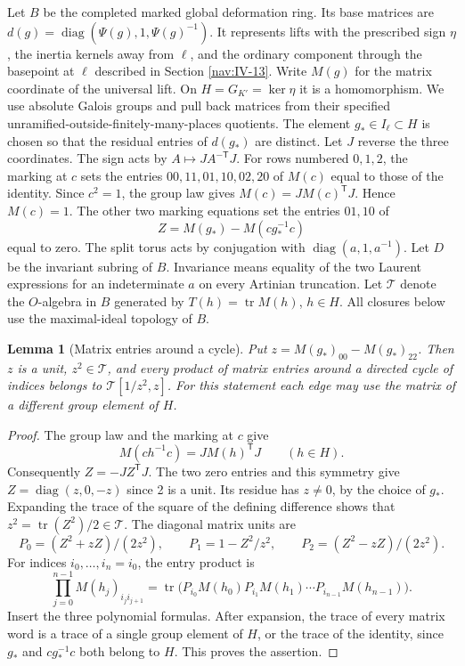 \documentclass[a4paper,11pt]{article}
\newtheorem{lemma}[proposition]{Lemma}
\theoremstyle{definition}
\theoremstyle{remark}
\numberwithin{equation}{section}
\begin{document}
Let \(B\) be the completed marked global deformation ring.
Its base matrices are
\(d(g)=\operatorname{diag}(\Psi(g),1,\Psi(g)^{-1})\).
It represents lifts with the prescribed sign \(\eta\), the
inertia kernels away from \(\ell\), and the ordinary component
through the basepoint at \(\ell\) described in Section \ref{nav:IV-13}. Write \(M(g)\) for the matrix coordinate of the
universal lift. On \(H=G_{K'}=\ker\eta\) it is a homomorphism.
We use absolute Galois groups and pull back matrices from their
specified unramified-outside-finitely-many-places quotients.
The element \(g_*\in I_\ell\subset H\) is chosen so that the
residual entries of \(d(g_*)\) are distinct. Let \(J\) reverse
the three coordinates. The sign acts by
\(A\mapsto J A^{-\mathsf T}J\).
For rows numbered \(0,1,2\), the marking at \(c\) sets the
entries \(00,11,01,10,02,20\) of \(M(c)\) equal to those of
the identity. Since \(c^2=1\), the group law gives
\(M(c)=J M(c)^{\mathsf T}J\). Hence \(M(c)=1\).
The other two marking equations set the entries \(01,10\) of
\[
                  Z=M(g_*)-M(cg_*^{-1}c)
\]
equal to zero. The split torus acts by conjugation with
\(\operatorname{diag}(a,1,a^{-1})\). Let \(D\) be the
invariant subring of \(B\). Invariance means equality of the two
Laurent expressions for an indeterminate \(a\) on every Artinian
truncation. Let \(\mathcal T\) denote the \(O\)-algebra in \(B\)
generated by \(T(h)=\operatorname{tr}M(h)\), \(h\in H\).
All closures below use the maximal-ideal topology of \(B\).

\begin{lemma}[Matrix entries around a cycle]\label{lem:cycle71}
Put \(z=M(g_*)_{00}-M(g_*)_{22}\).
Then \(z\) is a unit, \(z^2\in\mathcal T\), and every product of
matrix entries around a directed cycle of indices belongs to
\(\mathcal T[1/z^2,z]\). For this statement each edge may use
the matrix of a different group element of \(H\).
\end{lemma}
\begin{proof}
The group law and the marking at \(c\) give
\[
               M(ch^{-1}c)=J M(h)^{\mathsf T}J\qquad(h\in H).
\]
Consequently \(Z=-J Z^{\mathsf T}J\).
The two zero entries and this symmetry give
\(Z=\operatorname{diag}(z,0,-z)\) since 2 is a unit.
Its residue has \(z\ne0\), by the choice of \(g_*\).
Expanding the trace of the square of the defining difference
shows that \(z^2=\operatorname{tr}(Z^2)/2\in\mathcal T\).
The diagonal matrix units are
\[
 P_0=(Z^2+zZ)/(2z^2),\qquad P_1=1-Z^2/z^2,\qquad
 P_2=(Z^2-zZ)/(2z^2).
\]
For indices \(i_0,\ldots,i_n=i_0\), the entry product is
\[
 \prod_{j=0}^{n-1} M(h_j)_{i_j i_{j+1}}
    =\operatorname{tr}\big(P_{i_0}M(h_0)P_{i_1}M(h_1)
                            \cdots P_{i_{n-1}}M(h_{n-1})\big).
\]
Insert the three polynomial formulas. After expansion, the
trace of every matrix word is a trace of a single group element
of \(H\), or the trace of the identity, since \(g_*\) and
\(cg_*^{-1}c\) both belong to \(H\). This proves the assertion.
\end{proof}
\end{document}
